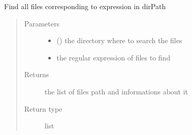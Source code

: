 \documentclass[a4paper,10pt,english]{sphinxmanual}
\begin{document}
\begin{fulllineitems}
\label{\detokenize{commands/apidoc/src:src.logger.list_log_file}}
Find all files corresponding to expression in dirPath
\begin{quote}\begin{description}
\item[{Parameters}] \leavevmode\begin{itemize}
\item {} 
 () \textendash{} the directory where to search the files

\item {} 
 \textendash{} the regular expression of files to find

\end{itemize}

\item[{Returns}] \leavevmode
the list of files path and informations about it

\item[{Return type}] \leavevmode
list

\end{description}\end{quote}

\end{fulllineitems}

\end{document}
